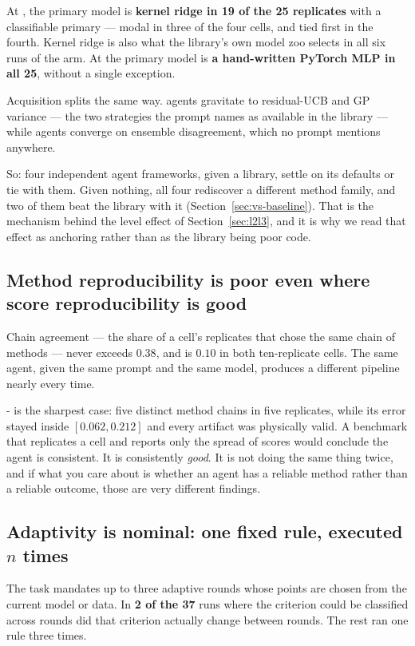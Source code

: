 At \Ltwo{}, the primary model is \textbf{kernel ridge in 19 of the 25
replicates} with a classifiable primary --- modal in three of the four cells,
and tied first in the fourth. Kernel ridge is also what the library's own model
zoo selects in all six runs of the \Lzero{} arm. At \Lthree{} the primary model
is \textbf{a hand-written PyTorch MLP in all 25}, without a single exception.

Acquisition splits the same way. \Ltwo{} agents gravitate to residual-UCB and
GP variance --- the two strategies the \Ltwo{} prompt names as available in the
library --- while \Lthree{} agents converge on ensemble disagreement, which no
prompt mentions anywhere.

So: four independent agent frameworks, given a library, settle on its defaults
or tie with them. Given nothing, all four rediscover a different method family,
and two of them beat the library with it (Section~\ref{sec:vs-baseline}). That
is the mechanism behind the level effect of Section~\ref{sec:l2l3}, and it is
why we read that effect as anchoring rather than as the library being poor
code.

\subsection{Method reproducibility is poor even where score reproducibility is good}

Chain agreement --- the share of a cell's replicates that chose the same chain
of methods --- never exceeds $0.38$, and is $0.10$ in both ten-replicate cells.
The same agent, given the same prompt and the same model, produces a different
pipeline nearly every time.

\Lthree{}- is the sharpest case: five distinct method chains in five
replicates, while its error stayed inside $[0.062, 0.212]$ and every artifact
was physically valid. A benchmark that replicates a cell and reports only the
spread of scores would conclude the agent is consistent. It is consistently
\emph{good}. It is not doing the same thing twice, and if what you care about is
whether an agent has a reliable method rather than a reliable outcome, those are
very different findings.

\subsection{Adaptivity is nominal: one fixed rule, executed $n$ times}

The task mandates up to three adaptive rounds whose points are chosen from the
current model or data. In \textbf{2 of the 37} runs where the criterion could be
classified across rounds did that criterion actually change between rounds. The
rest ran one rule three times.

